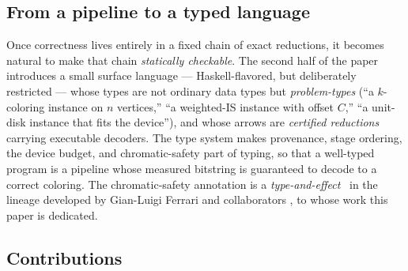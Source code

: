 \documentclass[11pt]{article}
\theoremstyle{definition}
\theoremstyle{remark}
\begin{document}
\subsection{From a pipeline to a typed language}

Once correctness lives entirely in a fixed chain of exact reductions, it becomes
natural to make that chain \emph{statically checkable}. The second half of the paper
introduces a small surface language --- Haskell-flavored, but deliberately restricted
--- whose types are not ordinary data types but \emph{problem-types} (``a $k$-coloring
instance on $n$ vertices,'' ``a weighted-IS instance with offset $C$,'' ``a unit-disk
instance that fits the device''), and whose arrows are \emph{certified reductions}
carrying executable decoders. The type system makes provenance, stage ordering, the
device budget, and chromatic-safety part of typing, so that a well-typed program is a
pipeline whose measured bitstring is guaranteed to decode to a correct coloring. The
chromatic-safety annotation is a \emph{type-and-effect}~\cite{LucassenGifford1988} in
the lineage developed by Gian-Luigi Ferrari and collaborators
\cite{BartolettiDeganoFerrariZunino2009,DeganoFerrariGalletta2016}, to whose work
this paper is dedicated.

\subsection{Contributions}
\end{document}
